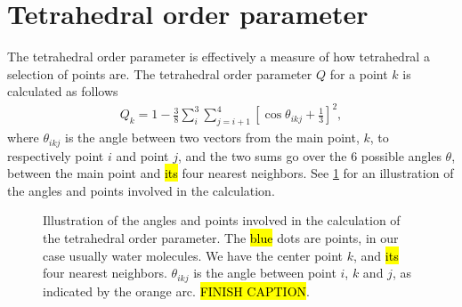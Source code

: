 \section{Tetrahedral order parameter}
The tetrahedral order parameter\cite{errington2001relationship} is effectively a measure of how tetrahedral a selection of points are. The tetrahedral order parameter $Q$ for a point $k$ is calculated as follows%
\begin{align*}
    Q_k = 1 - \frac{3}{8}\sum_i^3\sum_{j=i+1}^4 \left[ \cos \theta_{ikj} + \frac{1}{3} \right]^2,
\end{align*}%
%
%     
%     
%
where $\theta_{ikj}$ is the angle between two vectors from the main point, $k$, to respectively point $i$ and point $j$, and the two sums go over the 6 possible angles $\theta$, between the main point and \hl{its} four nearest neighbors. See \cref{fig:top_tetrahedra} for an illustration of the angles and points involved in the calculation.
%
\begin{figure}[htpb]%
    \centering%
    \caption{%
        Illustration of the angles and points involved in the calculation of the tetrahedral order parameter. The \hl{blue} dots are points, in our case usually water molecules. We have the center point $k$, and \hl{its} four nearest neighbors. $\theta_{ikj}$ is the angle between point $i$, $k$ and $j$, as indicated by the orange arc. \hl{FINISH CAPTION}. %
        \label{fig:top_tetrahedra}%
    }%
\end{figure}%

